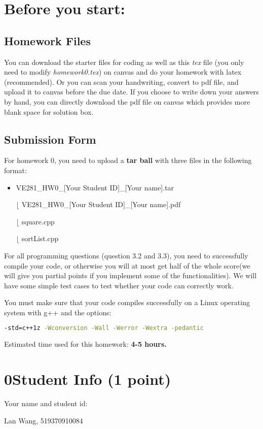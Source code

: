 \documentclass[11pt]{exam}
\begin{document}
\setlength{\parindent}{0pt}
\section*{Before you start:}

\subsection*{Homework Files}
You can download the starter files for coding as well as this \textit{tex} file (you only need to modify \textit{homework0.tex}) on canvas and do your homework with latex (recommended). Or you can scan your handwriting, convert to pdf file, and upload it to canvas before the due date. If you choose to write down your answers by hand, you can directly download the pdf file on canvas which provides more blank space for solution box.\\

\subsection*{Submission Form}
For homework 0, you need to upload a \textbf{tar ball} with three files in the following format:
\begin{itemize}
\item VE281\_HW0\_[Your Student ID]\_[Your name].tar

$\lfloor$ VE281\_HW0\_[Your Student ID]\_[Your name].pdf

$\lfloor$ square.cpp

$\lfloor$ sortList.cpp
\end{itemize}

For all programming questions (question 3.2 and 3.3), you need to successfully compile your code, or otherwise you will at most get half of the whole score(we will give you partial points if you implement some of the functionalities). We will have some simple test cases to test whether your code can correctly work.

You must make sure that your code compiles successfully on a Linux operating system with g++ and the options:
\begin{lstlisting}[language=bash]
-std=c++1z -Wconversion -Wall -Werror -Wextra -pedantic
\end{lstlisting}

Estimated time used for this homework: \textbf{4-5 hours.}

\newpage
\section*{0\quad Student Info (1 point)}
Your name and student id:
\begin{solution}
Lan Wang, 519370910084
\end{solution}
\end{document}
